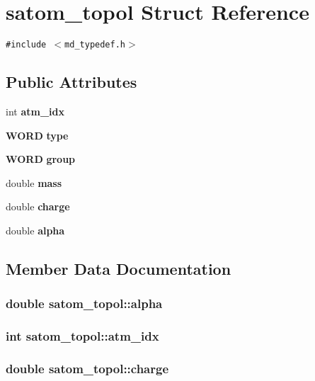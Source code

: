 \section{satom\_\-topol Struct Reference}
\label{structsatom__topol}
{\tt \#include $<$md\_\-typedef.h$>$}

\subsection*{Public Attributes}
\begin{CompactItemize}
\item 
int {\bf atm\_\-idx}
\item 
{\bf WORD} {\bf type}
\item 
{\bf WORD} {\bf group}
\item 
double {\bf mass}
\item 
double {\bf charge}
\item 
double {\bf alpha}
\end{CompactItemize}


\subsection{Member Data Documentation}
\subsubsection{\setlength{\rightskip}{0pt plus 5cm}double {\bf satom\_\-topol::alpha}}\label{structsatom__topol_0c96204bb01d8f0df44222304f2982fc}


\subsubsection{\setlength{\rightskip}{0pt plus 5cm}int {\bf satom\_\-topol::atm\_\-idx}}\label{structsatom__topol_420fb44bd06283a0fd8aa4d765fc5f74}


\subsubsection{\setlength{\rightskip}{0pt plus 5cm}double {\bf satom\_\-topol::charge}}\label{structsatom__topol_97e95a3dd40c2c4319209d7e3a4164e1}


